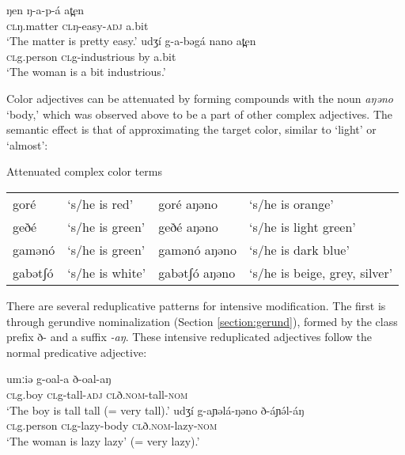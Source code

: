 	
\ea
	\ea \gll ŋen ŋ-a-p-á 		at̪en\\
			\textsc{cl}ŋ.matter	\textsc{cl}ŋ-easy-\textsc{adj}	a.bit\\
		\glt ‘The matter is pretty easy.’
	\ex	\gll udʒí 		g-a-bəgá nano	 	at̪en	\\
			\textsc{cl}g.person	\textsc{cl}g-industrious by 	a.bit\\
		\glt ‘The woman is a bit industrious.'
\z \label{ex:ch10:bit}
	\z 

Color adjectives can be attenuated by forming compounds with the noun \textit{aŋəno} `body,' which was observed above to be a part of other complex adjectives. The semantic effect is that of approximating the target color, similar to `light' or `almost':

\ea Attenuated complex color terms \\
\begin{tabular}[t]{llll}
goré & `s/he is red' & goré aŋəno & `s/he  is orange'\\
geðé & `s/he is green' & geðé aŋəno & `s/he is light green’ \\
gamənó  & `s/he is green' & gamənó aŋəno & `s/he is dark blue'\\
gabətʃó  & ‘s/he is white' & gabətʃó aŋəno & ‘s/he is beige, grey, silver'\\
\end{tabular}
\z

There are several reduplicative patterns for intensive modification. The first is through gerundive nominalization (Section \ref{section:gerund}), formed by the class prefix ð- and a suffix \textit{-aŋ}. These intensive reduplicated adjectives follow the normal predicative adjective:

\ea
	\ea \gll umːiə 	g-oal-a		ð-oal-aŋ\\
			\textsc{cl}g.boy	\textsc{cl}g-tall-\textsc{adj}	\textsc{cl}ð.\textsc{nom}-tall-\textsc{nom}\\
		\glt ‘The boy is tall tall (= very tall).’ %
	\ex	\gll udʒí 		g-aɲəlá-ŋəno 		ð-áɲə́l-áŋ	\\
			\textsc{cl}g.person	\textsc{cl}g-lazy-body	\textsc{cl}ð.\textsc{nom}-lazy-\textsc{nom}\\
		\glt ‘The woman is lazy lazy' (= very lazy).'
\z \z 
	 
